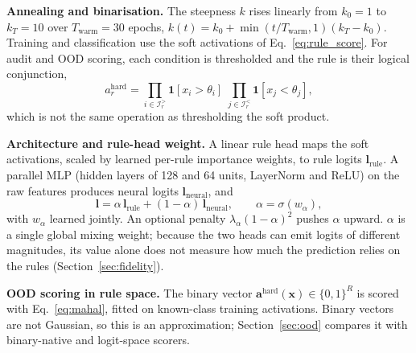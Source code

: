 \documentclass[journal]{IEEEtran}
\begin{document}
\textbf{Annealing and binarisation.} The steepness $k$ rises linearly from $k_0{=}1$ to $k_T{=}10$ over $T_{\mathrm{warm}}{=}30$ epochs, $k(t) = k_0 + \min(t/T_{\mathrm{warm}},1)(k_T{-}k_0)$. Training and classification use the soft activations of Eq.~\ref{eq:rule_score}. For audit and OOD scoring, each condition is thresholded and the rule is their logical conjunction,
\begin{equation}
  a_r^{\mathrm{hard}} = \prod_{i\in\mathcal{I}_r^{>}}\mathbf{1}[x_i{>}\theta_i]\;
                        \prod_{j\in\mathcal{I}_r^{<}}\mathbf{1}[x_j{<}\theta_j],
  \label{eq:binarise}
\end{equation}
which is not the same operation as thresholding the soft product.

\textbf{Architecture and rule-head weight.} A linear rule head maps the soft activations, scaled by learned per-rule importance weights, to rule logits $\mathbf{l}_{\mathrm{rule}}$. A parallel MLP (hidden layers of 128 and 64 units, LayerNorm and ReLU) on the raw features produces neural logits $\mathbf{l}_{\mathrm{neural}}$, and
\begin{equation}
  \mathbf{l} = \alpha\,\mathbf{l}_{\mathrm{rule}} +
               (1{-}\alpha)\,\mathbf{l}_{\mathrm{neural}},\qquad \alpha{=}\sigma(w_\alpha),
  \label{eq:alpha_gate}
\end{equation}
with $w_\alpha$ learned jointly. An optional penalty $\lambda_\alpha(1{-}\alpha)^2$ pushes $\alpha$ upward. $\alpha$ is a single global mixing weight; because the two heads can emit logits of different magnitudes, its value alone does not measure how much the prediction relies on the rules (Section~\ref{sec:fidelity}).

\textbf{OOD scoring in rule space.} The binary vector $\mathbf{a}^{\mathrm{hard}}(\mathbf{x})\in\{0,1\}^R$ is scored with Eq.~\ref{eq:mahal}, fitted on known-class training activations. Binary vectors are not Gaussian, so this is an approximation; Section~\ref{sec:ood} compares it with binary-native and logit-space scorers.
\end{document}
